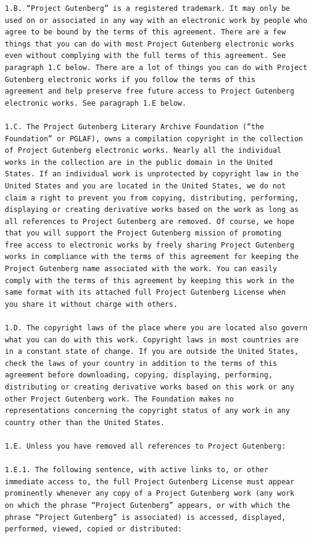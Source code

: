\documentclass{article}
\begin{document}
\begin{verbatim}
1.B. “Project Gutenberg” is a registered trademark. It may only be
used on or associated in any way with an electronic work by people who
agree to be bound by the terms of this agreement. There are a few
things that you can do with most Project Gutenberg electronic works
even without complying with the full terms of this agreement. See
paragraph 1.C below. There are a lot of things you can do with Project
Gutenberg electronic works if you follow the terms of this
agreement and help preserve free future access to Project Gutenberg
electronic works. See paragraph 1.E below.

1.C. The Project Gutenberg Literary Archive Foundation (“the
Foundation” or PGLAF), owns a compilation copyright in the collection
of Project Gutenberg electronic works. Nearly all the individual
works in the collection are in the public domain in the United
States. If an individual work is unprotected by copyright law in the
United States and you are located in the United States, we do not
claim a right to prevent you from copying, distributing, performing,
displaying or creating derivative works based on the work as long as
all references to Project Gutenberg are removed. Of course, we hope
that you will support the Project Gutenberg mission of promoting
free access to electronic works by freely sharing Project Gutenberg
works in compliance with the terms of this agreement for keeping the
Project Gutenberg name associated with the work. You can easily
comply with the terms of this agreement by keeping this work in the
same format with its attached full Project Gutenberg License when
you share it without charge with others.

1.D. The copyright laws of the place where you are located also govern
what you can do with this work. Copyright laws in most countries are
in a constant state of change. If you are outside the United States,
check the laws of your country in addition to the terms of this
agreement before downloading, copying, displaying, performing,
distributing or creating derivative works based on this work or any
other Project Gutenberg work. The Foundation makes no
representations concerning the copyright status of any work in any
country other than the United States.

1.E. Unless you have removed all references to Project Gutenberg:

1.E.1. The following sentence, with active links to, or other
immediate access to, the full Project Gutenberg License must appear
prominently whenever any copy of a Project Gutenberg work (any work
on which the phrase “Project Gutenberg” appears, or with which the
phrase “Project Gutenberg” is associated) is accessed, displayed,
performed, viewed, copied or distributed:


\end{verbatim}
\end{document}
